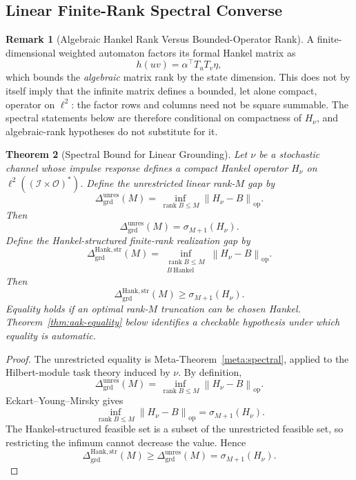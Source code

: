 \documentclass[12pt]{article}
\newtheorem{theorem}{Theorem}[section]
\theoremstyle{definition}
\newtheorem{remark}[theorem]{Remark}
\newcommand{\norm}[1]{\left\lVert#1\right\rVert}
\newcommand{\Dunres}{\Delta_{\mathrm{grd}}^{\mathrm{unres}}}
\newcommand{\DHankstr}{\Delta_{\mathrm{grd}}^{\mathrm{Hank,str}}}
\begin{document}
\subsection{Linear Finite-Rank Spectral Converse}
\label{subsec:grounding-spectral}

\begin{remark}[Algebraic Hankel Rank Versus Bounded-Operator Rank]
\label{rem:algebraic-vs-operator-rank}
A finite-dimensional weighted automaton factors its formal Hankel matrix as
\[
h(uv)=\alpha^\top T_uT_v\eta,
\]
which bounds the \emph{algebraic} matrix rank by the state dimension.  This
does not by itself imply that the infinite matrix defines a bounded, let alone
compact, operator on $\ell^2$: the factor rows and columns need not be square
summable.  The spectral statements below are therefore conditional on
compactness of $H_\nu$, and algebraic-rank hypotheses do not substitute for
it.
\end{remark}

\begin{theorem}[Spectral Bound for Linear Grounding]
\label{thm:spectral-grounding}
Let $\nu$ be a stochastic channel whose impulse response defines a compact
Hankel operator $H_\nu$ on $\ell^2((\mathcal I\times\mathcal O)^*)$.
Define the unrestricted linear rank-$M$ gap by
\[
\Dunres(M)
=
\inf_{\operatorname{rank}B\le M}
\norm{H_\nu-B}_{\mathrm{op}}.
\]
Then
\[
\Dunres(M)
=
\sigma_{M+1}(H_\nu).
\]
Define the Hankel-structured finite-rank realization gap by
\[
\DHankstr(M)
=
\inf_{\substack{
\operatorname{rank}B\le M\\
B\ \text{Hankel}
}}
\norm{H_\nu-B}_{\mathrm{op}}.
\]
Then
\[
\DHankstr(M)
\ge
\sigma_{M+1}(H_\nu).
\]
Equality holds if an optimal rank-$M$ truncation can be chosen Hankel.
Theorem~\ref{thm:aak-equality} below identifies a checkable hypothesis under
which equality is automatic.
\end{theorem}

\begin{proof}
The unrestricted equality is Meta-Theorem~\ref{meta:spectral}, applied to the
Hilbert-module task theory induced by $\nu$.  By definition,
\[
\Dunres(M)
=
\inf_{\operatorname{rank}B\le M}
\norm{H_\nu-B}_{\mathrm{op}}.
\]
Eckart--Young--Mirsky gives
\[
\inf_{\operatorname{rank}B\le M}
\norm{H_\nu-B}_{\mathrm{op}}
=
\sigma_{M+1}(H_\nu).
\]
The Hankel-structured feasible set is a subset of the unrestricted feasible
set, so restricting the infimum cannot decrease the value.  Hence
\[
\DHankstr(M)
\ge
\Dunres(M)
=
\sigma_{M+1}(H_\nu).
\]
\end{proof}
\end{document}
